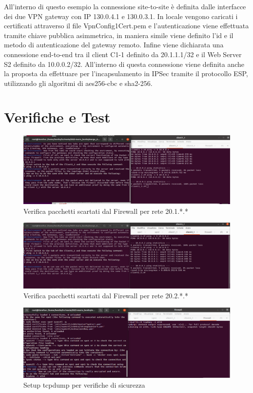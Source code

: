 All'interno di questo esempio la connessione site-to-site è definita dalle interfacce dei due VPN gateway con IP 130.0.4.1 e 130.0.3.1. In locale vengono caricati i certificati attraverso
il file VpnConfig1Cert.pem e l'autenticazione viene effettuata tramite chiave pubblica asimmetrica, in maniera simile viene definito l'id e il metodo di autenticazione del gateway remoto.
Infine viene dichiarata una connessione end-to-end tra il client C1-1 definito da 20.1.1.1/32 e il Web Server S2 definito da 10.0.0.2/32. All'interno di questa connessione viene definita anche la proposta
da effettuare per l'incapsulamento in IPSec tramite il protocollo ESP, utilizzando gli algoritmi di aes256-cbc e sha2-256.

\section{Verifiche e Test}

\begin{figure}[H] 
    \centering
    \includegraphics[width=1\textwidth]{(1)FirewallDiscard1.png} 
    \caption{Verifica pacchetti scartati dal Firewall per rete 20.1.*.*}
    \label{fig:Verifica1}
\end{figure}

\begin{figure}[H] 
    \centering
    \includegraphics[width=1\textwidth]{(2)FirewallDiscard2.png} 
    \caption{Verifica pacchetti scartati dal Firewall per rete 20.2.*.*}
    \label{fig:Verifica2}
\end{figure}

\begin{figure}[H] 
    \centering
    \includegraphics[width=1\textwidth]{(3)Firewall_tcpdump_setup.png} 
    \caption{Setup tcpdump per verifiche di sicurezza}
    \label{fig:Verifica3}
\end{figure}


